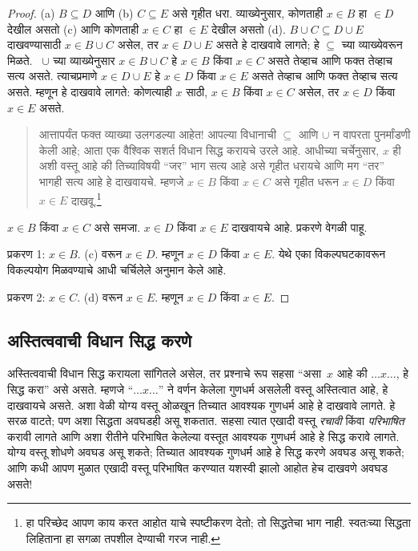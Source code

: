 \begin{proof}
(a) $B \subseteq D$ आणि (b) $C \subseteq E$ असे गृहीत धरा. व्याख्येनुसार, कोणताही $x \in B$ हा $\in D$ देखील असतो (c) आणि कोणताही $x \in C$ हा $\in E$ देखील असतो (d). $B \cup C \subseteq D \cup E$ दाखवण्यासाठी $x \in B \cup C$ असेल, तर $x \in D \cup E$ असते हे दाखवावे लागते; हे $\subseteq$ च्या व्याख्येवरून मिळते. ~$ \cup$ च्या व्याख्येनुसार $x \in B \cup C$ हे $x \in B$ किंवा $x \in C$ असते तेव्हाच आणि फक्त तेव्हाच सत्य असते. त्याचप्रमाणे $x \in D \cup E$ हे $x \in D$ किंवा $x \in E$ असते तेव्हाच आणि फक्त तेव्हाच सत्य असते. म्हणून हे दाखवावे लागते: कोणत्याही $x$ साठी, $x \in B$ किंवा $x \in C$ असेल, तर $x \in D$ किंवा $x \in E$ असते.

\begin{quote}
आत्तापर्यंत फक्त व्याख्या उलगडल्या आहेत!{} आपल्या विधानाची $\subseteq$ आणि $\cup$ न वापरता पुनर्मांडणी केली आहे; आता एक वैश्विक सशर्त विधान सिद्ध करायचे उरले आहे. आधीच्या चर्चेनुसार, $x$ ही अशी वस्तू आहे की तिच्याविषयी “जर” भाग सत्य आहे असे गृहीत धरायचे आणि मग “तर” भागही सत्य आहे हे दाखवायचे. म्हणजे $x \in B$ किंवा $x \in C$ असे गृहीत धरून $x \in D$ किंवा $x \in E$ दाखवू.\footnote{हा परिच्छेद आपण काय करत आहोत याचे स्पष्टीकरण देतो; तो सिद्धतेचा भाग नाही. स्वतःच्या सिद्धता लिहिताना हा सगळा तपशील देण्याची गरज नाही.}
\end{quote}

$x \in B$ किंवा $x \in C$ असे समजा. $x \in D$ किंवा $x \in E$ दाखवायचे आहे. प्रकरणे वेगळी पाहू.

प्रकरण 1: $x \in B$. (c) वरून $x \in D$. म्हणून $x \in D$ किंवा $x \in E$. येथे एका विकल्पघटकावरून विकल्पयोग मिळवण्याचे आधी चर्चिलेले अनुमान केले आहे.

प्रकरण 2: $x \in C$. (d) वरून $x \in E$. म्हणून $x \in D$ किंवा $x \in E$.
\end{proof}

\subsection{अस्तित्ववाची विधान सिद्ध करणे}

अस्तित्ववाची विधान सिद्ध करायला सांगितले असेल, तर प्रश्नाचे रूप सहसा “असा~$x$ आहे की $\dots x \dots$, हे सिद्ध करा” असे असते. म्हणजे “$\dots x \dots$” ने वर्णन केलेला गुणधर्म असलेली वस्तू अस्तित्वात आहे, हे दाखवायचे असते. अशा वेळी योग्य वस्तू ओळखून तिच्यात आवश्यक गुणधर्म आहे हे दाखवावे लागते. हे सरळ वाटते; पण अशा सिद्धता अवघडही असू शकतात. सहसा त्यात एखादी वस्तू \emph{रचावी} किंवा \emph{परिभाषित} करावी लागते आणि अशा रीतीने परिभाषित केलेल्या वस्तूत आवश्यक गुणधर्म आहे हे सिद्ध करावे लागते. योग्य वस्तू शोधणे अवघड असू शकते; तिच्यात आवश्यक गुणधर्म आहे हे सिद्ध करणे अवघड असू शकते; आणि कधी आपण मुळात एखादी वस्तू परिभाषित करण्यात यशस्वी झालो आहोत हेच दाखवणे अवघड असते!{}

